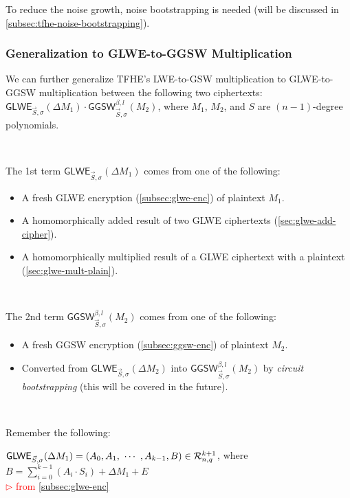 To reduce the noise growth, noise bootstrapping is needed (will be discussed in \autoref{subsec:tfhe-noise-bootstrapping}).

\subsubsection{Generalization to GLWE-to-GGSW Multiplication}
\label{subsubsec:tfhe-glwe-to-ggsw-multiplication}

We can further generalize TFHE's LWE-to-GSW multiplication to GLWE-to-GGSW multiplication between the following two ciphertexts: $\textsf{GLWE}_{\vec{S}, \sigma}(\Delta M_1) \cdot \textsf{GGSW}_{\vec{S}, \sigma}^{\beta, l}(M_2)$, where $M_1$, $M_2$, and $S$ are $(n-1)$-degree polynomials. 


$ $

\noindent The 1st term $\textsf{GLWE}_{\vec{S}, \sigma}(\Delta M_1)$ comes from one of the following: 
\begin{itemize}
\item A fresh GLWE encryption (\autoref{subsec:glwe-enc}) of plaintext $M_1$. 
\item A homomorphically added result of two GLWE ciphertexts (\autoref{sec:glwe-add-cipher}). 
\item A homomorphically multiplied result of a GLWE ciphertext with a plaintext (\autoref{sec:glwe-mult-plain}). 
\end{itemize}

$ $

\noindent The 2nd term $\textsf{GGSW}_{\vec{S}, \sigma}^{\beta, l}(M_2)$ comes from one of the following:
\begin{itemize}
\item A fresh GGSW encryption (\autoref{subsec:ggsw-enc}) of plaintext $M_2$.
\item Converted from $\textsf{GLWE}_{\vec{S}, \sigma}(\Delta M_2)$ into $\textsf{GGSW}_{\vec{S}, \sigma}^{\beta, l}(M_2)$ by \textit{circuit bootstrapping} (this will be covered in the future).
\end{itemize}

$ $

\noindent Remember the following: 

$\textsf{GLWE}_{\vec{S}, \sigma}(\Delta M_1) = (A_0, A_1, \text{ } \text{$\cdots$} \text{ }, A_{k-1}, B) \in \mathcal{R}_{n, q}^{k + 1}$, where $B = \sum\limits_{i=0}^{k-1}(A_i \cdot S_i) + \Delta M_1 + E$ \\ \textcolor{red}{ $\rhd$ from \autoref{subsec:glwe-enc}} 


